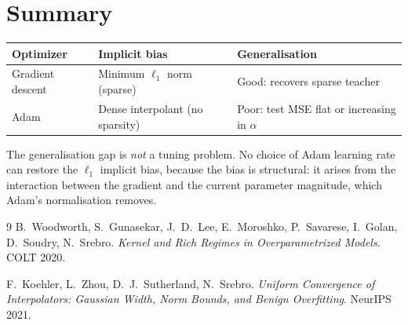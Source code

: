 \documentclass[11pt]{article}
\begin{document}
\section{Summary}

\begin{center}
\begin{tabular}{lll}
\hline
Optimizer & Implicit bias & Generalisation \\
\hline
Gradient descent & Minimum $\ell_1$ norm (sparse) & Good: recovers sparse teacher \\
Adam & Dense interpolant (no sparsity) & Poor: test MSE flat or increasing in $\alpha$ \\
\hline
\end{tabular}
\end{center}

The generalisation gap is \emph{not} a tuning problem.  No choice of Adam
learning rate can restore the $\ell_1$ implicit bias, because the bias is
structural: it arises from the interaction between the gradient and the current
parameter magnitude, which Adam's normalisation removes.

\begin{thebibliography}{9}
    B.\ Woodworth, S.\ Gunasekar, J.\ D.\ Lee, E.\ Moroshko, P.\ Savarese,
    I.\ Golan, D.\ Soudry, N.\ Srebro.
    \textit{Kernel and Rich Regimes in Overparametrized Models}.
    COLT 2020.

    F.\ Koehler, L.\ Zhou, D.\ J.\ Sutherland, N.\ Srebro.
    \textit{Uniform Convergence of Interpolators: Gaussian Width, Norm Bounds,
    and Benign Overfitting}.
    NeurIPS 2021.
\end{thebibliography}
\end{document}
